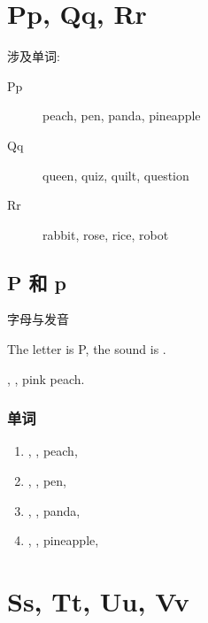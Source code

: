 

\chapter{Pp, Qq, Rr}

\noindent 涉及单词:

\begin{description}
  \item[Pp] peach, pen, panda, pineapple
  \item[Qq] queen, quiz, quilt, question
  \item[Rr] rabbit, rose, rice, robot
\end{description}

\section{P 和 p}

\noindent 字母与发音

The letter is P, the sound is .

, , pink peach.


\subsection{单词}

\begin{enumerate}
  \item {}, , peach, 
  \item {}, , pen, 
  \item {}, , panda, 
  \item {}, , pineapple, 
\end{enumerate}







\chapter{Ss, Tt, Uu, Vv}


